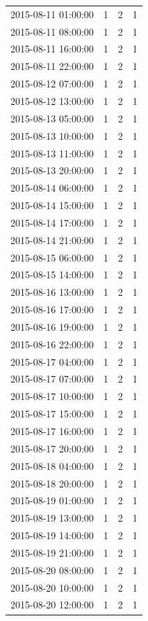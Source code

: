 \begin{tabular}{lrrr}
2015-08-11 01:00:00 & 1 & 2 & 1 \\
2015-08-11 08:00:00 & 1 & 2 & 1 \\
2015-08-11 16:00:00 & 1 & 2 & 1 \\
2015-08-11 22:00:00 & 1 & 2 & 1 \\
2015-08-12 07:00:00 & 1 & 2 & 1 \\
2015-08-12 13:00:00 & 1 & 2 & 1 \\
2015-08-13 05:00:00 & 1 & 2 & 1 \\
2015-08-13 10:00:00 & 1 & 2 & 1 \\
2015-08-13 11:00:00 & 1 & 2 & 1 \\
2015-08-13 20:00:00 & 1 & 2 & 1 \\
2015-08-14 06:00:00 & 1 & 2 & 1 \\
2015-08-14 15:00:00 & 1 & 2 & 1 \\
2015-08-14 17:00:00 & 1 & 2 & 1 \\
2015-08-14 21:00:00 & 1 & 2 & 1 \\
2015-08-15 06:00:00 & 1 & 2 & 1 \\
2015-08-15 14:00:00 & 1 & 2 & 1 \\
2015-08-16 13:00:00 & 1 & 2 & 1 \\
2015-08-16 17:00:00 & 1 & 2 & 1 \\
2015-08-16 19:00:00 & 1 & 2 & 1 \\
2015-08-16 22:00:00 & 1 & 2 & 1 \\
2015-08-17 04:00:00 & 1 & 2 & 1 \\
2015-08-17 07:00:00 & 1 & 2 & 1 \\
2015-08-17 10:00:00 & 1 & 2 & 1 \\
2015-08-17 15:00:00 & 1 & 2 & 1 \\
2015-08-17 16:00:00 & 1 & 2 & 1 \\
2015-08-17 20:00:00 & 1 & 2 & 1 \\
2015-08-18 04:00:00 & 1 & 2 & 1 \\
2015-08-18 20:00:00 & 1 & 2 & 1 \\
2015-08-19 01:00:00 & 1 & 2 & 1 \\
2015-08-19 13:00:00 & 1 & 2 & 1 \\
2015-08-19 14:00:00 & 1 & 2 & 1 \\
2015-08-19 21:00:00 & 1 & 2 & 1 \\
2015-08-20 08:00:00 & 1 & 2 & 1 \\
2015-08-20 10:00:00 & 1 & 2 & 1 \\
2015-08-20 12:00:00 & 1 & 2 & 1 \\

\end{tabular}

